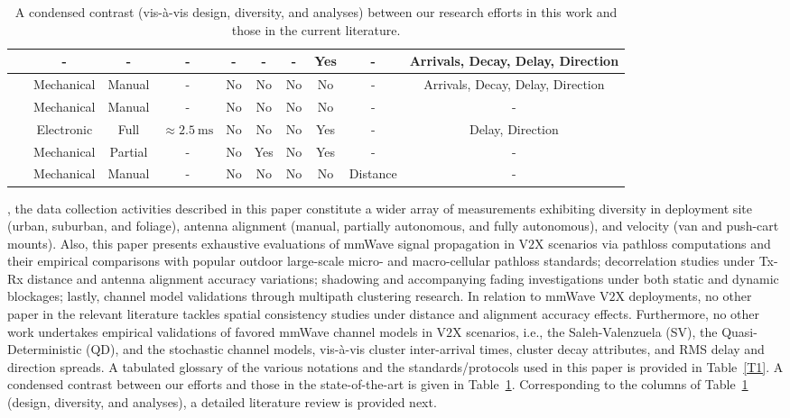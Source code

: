 \documentclass[10pt, twocolumn]{IEEEtran}
\begin{document}
\begin{table}
\begin{tabular}{|*{10}{c|}}
    \hline
   ~\cite{Indoor60G} & - & - & - & - & - & - & Yes & - & Arrivals, Decay, Delay, Direction\\
    \hline
   ~\cite{QDC_NIST} & Mechanical & Manual & - & No & No & No & No & - & Arrivals, Decay, Delay, Direction\\
    \hline
   ~\cite{D2DHumanBlockage} & Mechanical & Manual & - & No & No & No & No & - & -\\
    \hline
   ~\cite{DopplerHST} & Electronic & Full & ${\approx}\SI{2.5}{\milli\second}$ & No & No & No & Yes & - & Delay, Direction\\
    \hline
   ~\cite{V2XBlockages} & Mechanical & Partial & - & No & Yes & No & Yes & - & -\\
    \hline
   ~\cite{MacCartneyUrbanHumanBlockage} & Mechanical & Manual & - & No & No & No & No & Distance & -\\
    \hline
    \end{tabular}
    \vspace{-1mm}
    \caption{A condensed contrast (vis-\`{a}-vis design, diversity, and analyses) between our research efforts in this work and those in the current literature.}
    \vspace{-6mm}
    \label{T2}
\end{table}
, the data collection activities described in this paper constitute a wider array of measurements exhibiting diversity in deployment site (urban, suburban, and foliage), antenna alignment (manual, partially autonomous, and fully autonomous), and velocity (van and push-cart mounts). Also, this paper presents exhaustive evaluations of mmWave signal propagation in V$2$X scenarios via pathloss computations and their empirical comparisons with popular outdoor large-scale micro- and macro-cellular pathloss standards; decorrelation studies under Tx-Rx distance and antenna alignment accuracy variations; shadowing and accompanying fading investigations under both static and dynamic blockages; lastly, channel model validations through multipath clustering research. In relation to mmWave V$2$X deployments, no other paper in the relevant literature tackles spatial consistency studies under distance and alignment accuracy effects. Furthermore, no other work undertakes empirical validations of favored mmWave channel models in V$2$X scenarios, i.e., the Saleh-Valenzuela (SV), the Quasi-Deterministic (QD), and the stochastic channel models, vis-\`{a}-vis cluster inter-arrival times, cluster decay attributes, and RMS delay and direction spreads. A tabulated glossary of the various notations and the standards/protocols used in this paper is provided in Table~\ref{T1}. A condensed contrast between our efforts and those in the state-of-the-art is given in Table~\ref{T2}. Corresponding to the columns of Table~\ref{T2} (design, diversity, and analyses), a detailed literature review is provided next.\\
\end{document}
